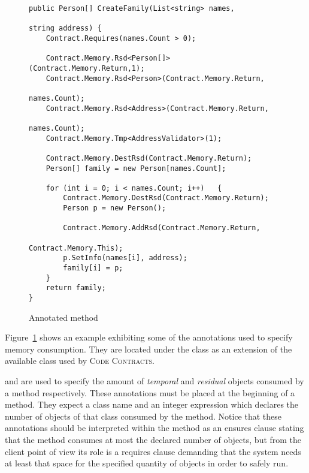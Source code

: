 
\begin{figure}[ht]
\begin{scriptsize}
\begin{lstlisting}[numbers=none]
public Person[] CreateFamily(List<string> names,
															string address) {
	Contract.Requires(names.Count > 0);
	
	Contract.Memory.Rsd<Person[]>(Contract.Memory.Return,1); 
	Contract.Memory.Rsd<Person>(Contract.Memory.Return,
															names.Count);
	Contract.Memory.Rsd<Address>(Contract.Memory.Return,
																names.Count);
	Contract.Memory.Tmp<AddressValidator>(1);
	
	Contract.Memory.DestRsd(Contract.Memory.Return);	
	Person[] family = new Person[names.Count];

	for (int i = 0; i < names.Count; i++)	{
		Contract.Memory.DestRsd(Contract.Memory.Return);
		Person p = new Person();

		Contract.Memory.AddRsd(Contract.Memory.Return,
														Contract.Memory.This);
		p.SetInfo(names[i], address);
		family[i] = p;
	}
	return family;
}
\end{lstlisting}
\end{scriptsize}
\vspace{-1.2em}
\caption{Annotated method}
\vspace{-1.8em}
\label{ex1}
\end{figure}


Figure~\ref{ex1} shows an example exhibiting some of the annotations used to specify memory consumption. 
They are located under the  class as an extension of the available class  used by \textsc{Code Contracts}.

 and  are used to specify  the amount  of \emph{temporal} and \emph{residual} objects consumed by a method respectively. 
These annotations must be placed at the beginning of a method. They expect a class name and an integer expression which declares the number of objects of that class consumed by the method.
Notice that these annotations should be interpreted within the method as an ensures clause stating that the method consumes at most the declared number of objects, but from the client point of view its role is a requires clause demanding that the system needs at least that space for the specified quantity of objects in order to safely run. 

